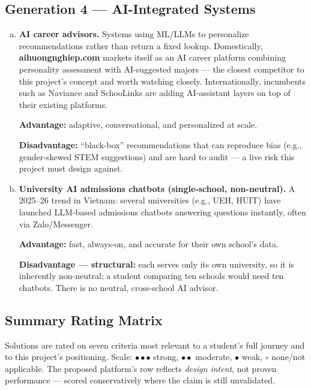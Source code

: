 \documentclass[a4paper]{article}
\begin{document}
\subsection{Generation 4 --- AI-Integrated Systems}

\begin{enumerate}[a.]
    \setlength{\itemsep}{1em}
    \item \textbf{AI career advisors.} Systems using ML/LLMs to personalize recommendations
    rather than return a fixed lookup. Domestically, \textbf{aihuongnghiep.com} markets itself
    as an AI career platform combining personality assessment with AI-suggested majors --- the
    closest competitor to this project's concept and worth watching closely. Internationally,
    incumbents such as Naviance and SchooLinks are adding AI-assistant layers on top of their
    existing platforms.

    \par\smallskip\noindent
    \textbf{Advantage:} adaptive, conversational, and personalized at
    scale.

    \par\smallskip\noindent
    \textbf{Disadvantage:} ``black-box'' recommendations that can reproduce bias (e.g.,
    gender-skewed STEM suggestions) and are hard to audit --- a live risk this project must
    design against.

    \item \textbf{University AI admissions chatbots (single-school, non-neutral).} A 2025--26
    trend in Vietnam: several universities (e.g., UEH, HUIT) have launched LLM-based admissions
    chatbots answering questions instantly, often via Zalo/Messenger.

    \par\smallskip\noindent
    \textbf{Advantage:} fast,
    always-on, and accurate for their own school's data.

    \par\smallskip\noindent
    \textbf{Disadvantage --- structural:}
    each serves only its own university, so it is inherently non-neutral; a student comparing
    ten schools would need ten chatbots. There is no neutral, cross-school AI advisor.
\end{enumerate}

\subsection{Summary Rating Matrix}

Solutions are rated on seven criteria most relevant to a student's full journey and to this
project's positioning. Scale: $\bullet\bullet\bullet$ strong, $\bullet\bullet$ moderate,
$\bullet$ weak, $\circ$ none/not applicable. The proposed platform's row reflects
\textit{design intent}, not proven performance --- scored conservatively where the claim is
still unvalidated.
\end{document}
